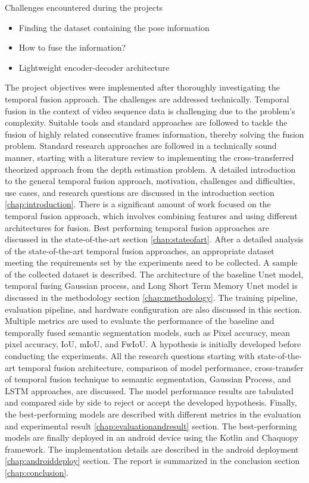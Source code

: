 	Challenges encountered during the projects
	
	\begin{itemize}
		\item Finding the dataset containing the pose information
		\item How to fuse the information?
		\item Lightweight encoder-decoder architecture
	\end{itemize}
	
	The project objectives were implemented after thoroughly investigating the temporal fusion approach. The challenges are addressed technically. Temporal fusion in the context of video sequence data is challenging due to the problem's complexity. Suitable tools and standard approaches are followed to tackle the fusion of highly related consecutive frames information, thereby solving the fusion problem. Standard research approaches are followed in a technically sound manner, starting with a literature review to implementing the cross-transferred theorized approach from the depth estimation problem. A detailed introduction to the general temporal fusion approach, motivation, challenges and difficulties, use cases, and research questions are discussed in the introduction section \ref{chap:introduction}. There is a significant amount of work focused on the temporal fusion approach, which involves combining features and using different architectures for fusion. Best performing temporal fusion approaches are discussed in the state-of-the-art section \ref{chap:stateofart}. After a detailed analysis of the state-of-the-art temporal fusion approaches, an appropriate dataset meeting the requirements set by the experiments need to be collected. A sample of the collected dataset is described. The architecture of the baseline Unet model, temporal fusing Gaussian process, and Long Short Term Memory Unet model is discussed in the methodology section \ref{chap:methodology}. The training pipeline, evaluation pipeline, and hardware configuration are also discussed in this section. Multiple metrics are used to evaluate the performance of the baseline and temporally fused semantic segmentation models, such as Pixel accuracy, mean pixel accuracy, IoU, mIoU, and FwIoU. A hypothesis is initially developed before conducting the experiments. All the research questions starting with state-of-the-art temporal fusion architecture, comparison of model performance, cross-transfer of temporal fusion technique to semantic segmentation, Gaussian Process, and LSTM approaches, are discussed. The model performance results are tabulated and compared side by side to reject or accept the developed hypothesis. Finally, the best-performing models are described with different metrics in the evaluation and experimental result \ref{chap:evaluationandresult} section. The best-performing models are finally deployed in an android device using the Kotlin and Chaquopy framework. The implementation details are described in the android deployment \ref{chap:androiddeploy} section. The report is summarized in the conclusion section \ref{chap:conclusion}.       
	
